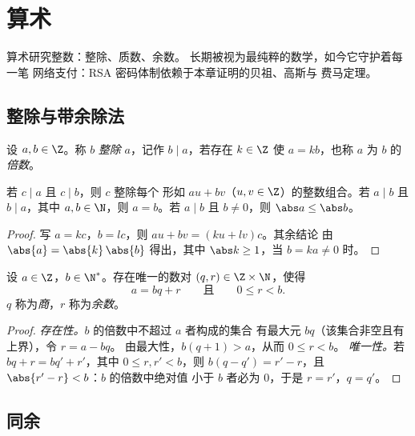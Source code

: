 \chapter{算术}\label{ch:g12:arith}

算术研究整数：整除、质数、余数。
长期被视为最纯粹的数学，如今它守护着每一笔
网络支付：RSA 密码体制依赖于本章证明的贝祖、高斯与
费马定理。

\section{整除与带余除法}

\begin{definition}[整除]\label{def:g12:arith:divides}
设 $a, b \in \Z$。称 $b$ \emph{整除} $a$，记作
$b \mid a$，若存在 $k \in \Z$ 使 $a = kb$，也称 $a$ 为 $b$ 的
\emph{倍数}。
\end{definition}

\begin{proposition}\label{prop:g12:arith:divprops}
若 $c \mid a$ 且 $c \mid b$，则 $c$ 整除每个
形如 $au + bv$（$u, v \in \Z$）的整数组合。若 $a \mid b$ 且 $b \mid a$，其中
$a,b \in \N$，则 $a = b$。若 $a \mid b$ 且 $b \neq 0$，则 $\abs a \leq \abs b$。
\end{proposition}

\begin{proof}
写 $a = kc$，$b = lc$，则 $au + bv = (ku + lv)c$。其余结论
由 $\abs{a} = \abs{k}\,\abs{b}$ 得出，其中
$\abs k \geq 1$，当 $b = ka \neq 0$ 时。
\end{proof}

\begin{theorem}[带余除法]\label{thm:g12:arith:euclid}
设 $a \in \Z$，$b \in \N^*$。存在唯一的数对
$(q, r) \in \Z \times \N$，使得
\[
a = bq + r \qquad\text{且}\qquad 0 \leq r < b .
\]
$q$ 称为\emph{商}，$r$ 称为\emph{余数}。
\end{theorem}

\begin{proof}
\emph{存在性。}$b$ 的倍数中不超过 $a$ 者构成的集合
有最大元 $bq$（该集合非空且有上界），令 $r = a - bq$。
由最大性，$b(q+1) > a$，从而 $0 \leq r < b$。
\emph{唯一性。}若 $bq + r = bq' + r'$，其中 $0 \leq r, r' < b$，则
$b(q - q') = r' - r$，且 $\abs{r' - r} < b$：$b$ 的倍数中绝对值
小于 $b$ 者必为 $0$，于是 $r = r'$，$q = q'$。
\end{proof}

\section{同余}

